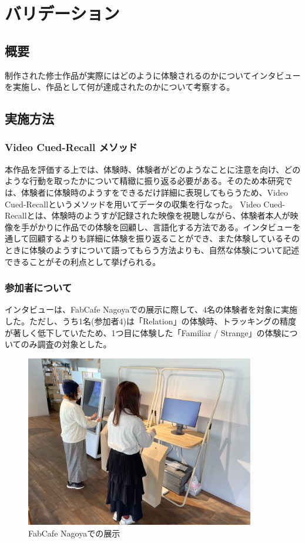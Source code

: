 \chapter{バリデーション}
\label{validation}
\section{概要}
制作された修士作品が実際にはどのように体験されるのかについてインタビューを実施し、作品として何が達成されたのかについて考察する。

\section{実施方法}
\subsection{Video Cued-Recall メソッド}
本作品を評価する上では、体験時、体験者がどのようなことに注意を向け、どのような行動を取ったかについて精緻に振り返る必要がある。そのため本研究では、体験者に体験時のようすをできるだけ詳細に表現してもらうため、Video Cued-Recallというメソッドを用いてデータの収集を行なった。 Video Cued-Recallとは、体験時のようすが記録された映像を視聴しながら、体験者本人が映像を手がかりに作品での体験を回顧し、言語化する方法である\cite{Costello2005}。インタビューを通して回顧するよりも詳細に体験を振り返ることができ、また体験しているそのときに体験のようすについて語ってもらう方法よりも、自然な体験について記述できることがその利点として挙げられる。

\subsection{参加者について}
インタビューは、FabCafe Nagoyaでの展示に際して、4名の体験者を対象に実施した。ただし、うち1名(参加者4)は「Relation」の体験時、トラッキングの精度が著しく低下していたため、1つ目に体験した「Familiar / Strange」の体験についてのみ調査の対象とした。

\begin{figure}[H]
  \centering
  \includegraphics[width=10cm]{img/exhibit_at_fabcafe.jpeg}
  \caption{FabCafe Nagoyaでの展示}
  \label{fig:exhibit_at_fabcafe}
\end{figure}

